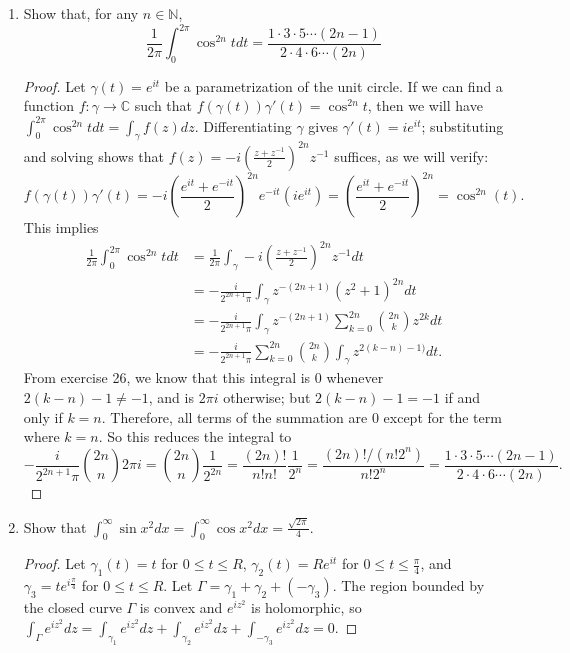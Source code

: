 \documentclass[10pt]{article}
\newcommand{\N}{\mathbb{N}}
\newcommand{\C}{\mathbb{C}}
\begin{document}
\begin{enumerate}
\item Show that, for any $n \in \N$,
$$
\frac{1}{2\pi}\int_0^{2\pi} \cos^{2n} t dt = \frac{1\cdot 3 \cdot 5 \cdots (2n-1)}{2 \cdot 4 \cdot 6 \cdots (2n)}
$$
\begin{proof}

Let $\gamma(t) = e^{it}$ be a parametrization of the unit circle.  If we can find a function $f:\gamma \rightarrow \C$ such that $f(\gamma(t))\gamma'(t) = \cos^{2n} t$, then we will have $\int_0^{2\pi} \cos^{2n} t dt = \int_{\gamma} f(z) dz$.  Differentiating $\gamma$ gives $\gamma'(t) = i e^{it}$; substituting and solving shows that $f(z) = -i(\frac{z + z^{-1}}{2})^{2n}z^{-1}$ suffices, as we will verify:
$$
f(\gamma(t))\gamma'(t) = -i\left(\frac{e^{it} + e^{-it}}{2} \right)^{2n} e^{-it} (ie^{it})
=
\left(\frac{e^{it} + e^{-it}}{2} \right)^{2n}
=
\cos^{2n}(t).
$$
This implies
\begin{align*}
\frac{1}{2\pi}\int_0^{2\pi} \cos^{2n} t dt
&=
\frac{1}{2\pi}\int_{\gamma} -i \left(\frac{z + z^{-1}}{2} \right)^{2n}z^{-1}dt
\\ &=
-\frac{i}{2^{2n+1}\pi}\int_{\gamma} z^{-(2n+1)}\left( z^2 + 1 \right)^{2n}dt
\\ &=
-\frac{i}{2^{2n+1}\pi}\int_{\gamma} z^{-(2n+1)} \sum_{k=0}^{2n} \binom{2n}{k} z^{2k} dt
\\ &=
-\frac{i}{2^{2n+1}\pi} \sum_{k=0}^{2n} \binom{2n}{k} \int_{\gamma} z^{2(k-n)-1)} dt.
\end{align*}
From exercise 26, we know that this integral is 0 whenever $2(k-n)-1 \neq -1$, and is $2\pi i$ otherwise; but $2(k-n)-1= -1$ if and only if $k = n$.  Therefore, all terms of the summation are 0 except for the term where $k = n$.  So this reduces the integral to
$$
-\frac{i}{2^{2n+1}\pi} \binom{2n}{n} 2\pi i = \binom{2n}{n} \frac{1}{2^{2n}} = \frac{(2n)!}{n!n!}\frac{1}{2^n} = \frac{(2n)! / (n! 2^n)}{n! 2^n} = \frac{1\cdot 3 \cdot 5 \cdots (2n-1)}{2 \cdot 4 \cdot 6 \cdots (2n)}.
$$
\end{proof}

\item Show that $\int_0^{\infty} \sin x^2 dx = \int_0^{\infty} \cos x^2 dx = \frac{\sqrt{2\pi}}{4}$.

\begin{proof}

Let $\gamma_1(t) = t$ for $0 \leq t \leq R$, $\gamma_2(t) = Re^{it}$ for $0 \leq t \leq \frac{\pi}{4}$, and $\gamma_3 = te^{i\frac{\pi}{4}}$ for $0 \leq t \leq R$.  Let $\Gamma = \gamma_1 + \gamma_2 + (-\gamma_3)$.  The region bounded by the closed curve $\Gamma$ is convex and $e^{iz^2}$ is holomorphic, so $\int_{\Gamma} e^{iz^2}dz = \int_{\gamma_1} e^{iz^2}dz + \int_{\gamma_2} e^{iz^2}dz + \int_{-\gamma_3} e^{iz^2}dz = 0$.


\end{proof}
\end{enumerate}
\end{document}
